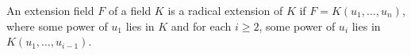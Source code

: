 An extension field $F$ of a field $K$ is a radical extension of $K$ if $F = K(u_1, \ldots, u_n)$, where some power of $u_1$ lies in $K$ and for each $i \geq 2$, some power of $u_i$ lies in $K(u_1, \ldots, u_{i-1})$.
